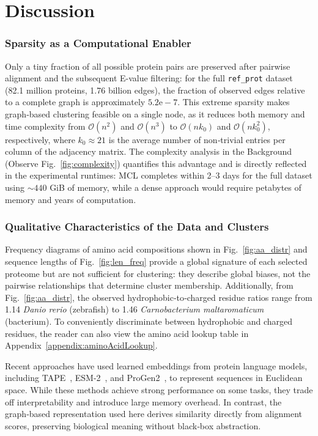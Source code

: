 \section{Discussion}

\subsubsection*{Sparsity as a Computational Enabler}

Only a tiny fraction of all possible protein pairs are preserved after
pairwise alignment and the subsequent E-value filtering: for the full \texttt{ref\_prot} dataset (82.1 million
proteins, 1.76 billion edges), the fraction of observed edges relative to a
complete graph is approximately \(5.2\text{e}-7\). This extreme sparsity makes
graph‑based clustering feasible on a single node, as it reduces both memory and
time complexity from \(\mathcal{O}(n^2)\) and \(\mathcal{O}(n^3)\) to
\(\mathcal{O}(n k_0)\) and \(\mathcal{O}(n k_0^2)\), respectively, where \(k_0
\approx 21\) is the average number of non‑trivial entries per column of the
adjacency matrix. The complexity analysis in the Background
(Observe Fig.~\ref{fig:complexity}) quantifies this advantage and is directly reflected
in the experimental runtimes: MCL completes within 2–3 days for the full
dataset using \(\sim 440\) GiB of memory, while a dense approach would
require petabytes of memory and years of computation.

\subsubsection*{Qualitative Characteristics of the Data and Clusters}

Frequency diagrams of amino acid compositions shown in Fig.~\ref{fig:aa_distr}
and sequence lengths of Fig.~\ref{fig:len_freq} provide a global signature of
each selected proteome but are not sufficient for clustering: they describe global
biases, not the pairwise relationships that determine cluster membership.
Additionally, from Fig.~\ref{fig:aa_distr}, the observed hydrophobic‑to‑charged
residue ratios range from 1.14 \textit{Danio rerio} (zebrafish) to 1.46
\textit{Carnobacterium maltaromaticum} (bacterium). To conveniently
discriminate between hydrophobic and charged residues, the reader can also view
the amino acid lookup table in Appendix~\ref{appendix:aminoAcidLookup}. 

Recent approaches have used learned embeddings from protein language models,
including TAPE~\cite{rao2019transformer}, ESM-2~\cite{lin2022esm2}, and
ProGen2~\cite{nijkamp2022progen2}, to represent sequences in Euclidean space.
While these methods achieve strong performance on some tasks, they trade off
interpretability and introduce large memory overhead. In contrast, the
graph‑based representation used here derives similarity directly from alignment
scores, preserving biological meaning without black‑box abstraction.

